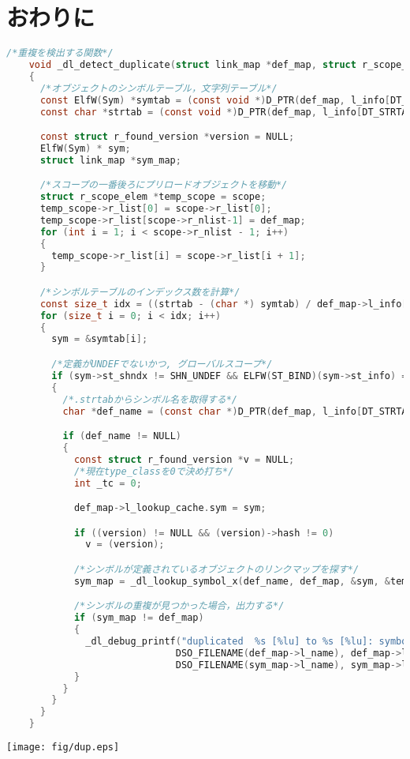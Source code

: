 \documentclass[submit,techreq,noauthor]{eco}	%
\begin{document}
\section{おわりに}



\begin{figure*}[t]
	\centering
  \caption{ソースコード：\_dl\_detect\_deplicate}
  \begin{lstlisting}[language=c]
    /*重複を検出する関数*/
    void _dl_detect_duplicate(struct link_map *def_map, struct r_scope_elem *scope)
    {
      /*オブジェクトのシンボルテーブル，文字列テーブル*/
      const ElfW(Sym) *symtab = (const void *)D_PTR(def_map, l_info[DT_SYMTAB]);
      const char *strtab = (const void *)D_PTR(def_map, l_info[DT_STRTAB]);

      const struct r_found_version *version = NULL;
      ElfW(Sym) * sym;
      struct link_map *sym_map;

      /*スコープの一番後ろにプリロードオブジェクトを移動*/
      struct r_scope_elem *temp_scope = scope;
      temp_scope->r_list[0] = scope->r_list[0];
      temp_scope->r_list[scope->r_nlist-1] = def_map;
      for (int i = 1; i < scope->r_nlist - 1; i++)
      {
        temp_scope->r_list[i] = scope->r_list[i + 1];
      }

      /*シンボルテーブルのインデックス数を計算*/
      const size_t idx = ((strtab - (char *) symtab) / def_map->l_info[DT_SYMENT]->d_un.d_val);
      for (size_t i = 0; i < idx; i++)
      {
        sym = &symtab[i];

        /*定義がUNDEFでないかつ, グローバルスコープ*/
        if (sym->st_shndx != SHN_UNDEF && ELFW(ST_BIND)(sym->st_info) == STB_GLOBAL)
        {
          /*.strtabからシンボル名を取得する*/
          char *def_name = (const char *)D_PTR(def_map, l_info[DT_STRTAB]) + (*sym).st_name;

          if (def_name != NULL)
          {
            const struct r_found_version *v = NULL;
            /*現在type_classを0で決め打ち*/
            int _tc = 0;

            def_map->l_lookup_cache.sym = sym;

            if ((version) != NULL && (version)->hash != 0)
              v = (version);

            /*シンボルが定義されているオブジェクトのリンクマップを探す*/
            sym_map = _dl_lookup_symbol_x(def_name, def_map, &sym, &temp_scope, v, _tc, DL_LOOKUP_ADD_DEPENDENCY | DL_LOOKUP_FOR_RELOCATE, 0);

            /*シンボルの重複が見つかった場合，出力する*/
            if (sym_map != def_map)
            {
              _dl_debug_printf("duplicated  %s [%lu] to %s [%lu]: symbol `%s'\n",
                              DSO_FILENAME(def_map->l_name), def_map->l_ns,
                              DSO_FILENAME(sym_map->l_name), sym_map->l_ns,def_name);
            }
          }
        }
      }
    }
  \end{lstlisting}
	\label{listings:code}
\end{figure*}

\begin{figure*}[t]
	\centering
  \texttt{[image: fig/dup.eps]}
	\caption{シンボル重複の検出結果}
	\label{fig:duplicate}
\end{figure*}



\setlength\baselineskip{12pt}
{\small
	
	
}
\end{document}
